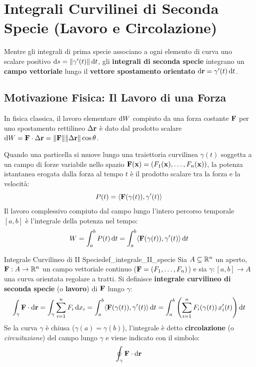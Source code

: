 \section{Integrali Curvilinei di Seconda Specie (Lavoro e Circolazione)}

Mentre gli integrali di prima specie associano a ogni elemento di curva uno scalare positivo $\mathop{}\!\mathrm{d} s = \lVert\gamma'(t)\rVert\mathop{}\!\mathrm{d} t$, gli \textbf{integrali di seconda specie} integrano un \textbf{campo vettoriale} lungo il \textbf{vettore spostamento orientato} $\mathop{}\!\mathrm{d}\mathbf{r} = \gamma'(t)\mathop{}\!\mathrm{d} t$.

\subsection{Motivazione Fisica: Il Lavoro di una Forza}

In fisica classica, il lavoro elementare $\mathop{}\!\mathrm{d} W$ compiuto da una forza costante $\mathbf{F}$ per uno spostamento rettilineo $\Delta \mathbf{r}$ è dato dal prodotto scalare $\mathop{}\!\mathrm{d} W = \mathbf{F} \cdot \Delta \mathbf{r} = \lVert\mathbf{F}\rVert \lVert\Delta \mathbf{r}\rVert \cos\theta$.

Quando una particella si muove lungo una traiettoria curvilinea $\gamma(t)$ soggetta a un campo di forze variabile nello spazio $\mathbf{F}(\mathbf{x}) = (F_1(\mathbf{x}), \dots, F_n(\mathbf{x}))$, la potenza istantanea erogata dalla forza al tempo $t$ è il prodotto scalare tra la forza e la velocità:
\[
P(t) = \langle\mathbf{F}(\gamma(t)), \gamma'(t)\rangle
\]
Il lavoro complessivo compiuto dal campo lungo l'intero percorso temporale $[a,b]$ è l'integrale della potenza nel tempo:
\[
W = \int_{a}^{b} P(t) \mathop{}\!\mathrm{d} t = \int_{a}^{b} \langle\mathbf{F}(\gamma(t)), \gamma'(t)\rangle \mathop{}\!\mathrm{d} t
\]

\begin{definizione}{Integrale Curvilineo di II Specie}{def_integrale_II_specie}
Sia $A \subseteq \mathbb{R}^n$ un aperto, $\mathbf{F}: A \to \mathbb{R}^n$ un campo vettoriale continuo ($\mathbf{F} = (F_1, \dots, F_n)$) e sia $\gamma: [a,b] \to A$ una curva orientata regolare a tratti. Si definisce \textbf{integrale curvilineo di seconda specie} (o \textbf{lavoro}) di $\mathbf{F}$ lungo $\gamma$:
\[
\int_\gamma \mathbf{F} \cdot \mathop{}\!\mathrm{d}\mathbf{r} = \int_\gamma \sum_{i=1}^n F_i \mathop{}\!\mathrm{d} x_i = \int_{a}^{b} \langle\mathbf{F}(\gamma(t)), \gamma'(t)\rangle \mathop{}\!\mathrm{d} t = \int_{a}^{b} \left( \sum_{i=1}^n F_i(\gamma(t)) \, x_i'(t) \right) \mathop{}\!\mathrm{d} t
\]
Se la curva $\gamma$ è chiusa ($\gamma(a) = \gamma(b)$), l'integrale è detto \textbf{circolazione} (o \emph{circuitazione}) del campo lungo $\gamma$ e viene indicato con il simbolo:
\[
\oint_\gamma \mathbf{F} \cdot \mathop{}\!\mathrm{d}\mathbf{r}
\]
\end{definizione}

